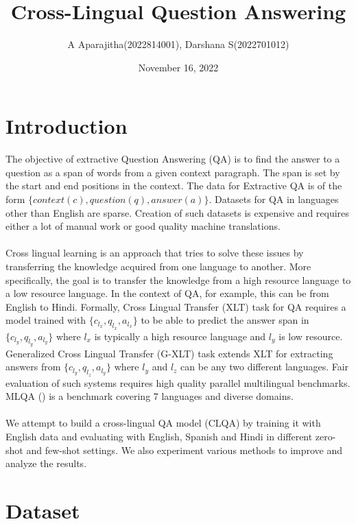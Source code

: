 \documentclass[12pt]{article}   %
\begin{document}
\title{Cross-Lingual Question Answering}   %
\author{A Aparajitha(2022814001), Darshana S(2022701012)}         %
\date{November 16, 2022}    %
\maketitle

\section{Introduction}

The objective of extractive Question Answering (QA) is to find the answer to a question as a span of words from a given context paragraph. The span is set by the start and end positions in the context. The data for Extractive QA is of the form $\{context(c), question(q), answer(a)\}$. Datasets for QA in languages other than English are sparse. Creation of such datasets is expensive and requires either a lot of manual work or good quality machine translations. \\ \\Cross lingual learning is an approach that tries to solve these issues by transferring the knowledge acquired from one language to another. More specifically, the goal is to transfer the knowledge from a high resource language to a low resource language. In the context of QA, for example, this can be from English to Hindi. Formally, Cross Lingual Transfer (XLT) task for QA requires a model trained with $\{c_{l_{x}}, q_{l_{x}}, a_{l_{x}}\}$ to be able to predict the answer span in $\{c_{l_{y}}, q_{l_{y}}, a_{l_{y}}\}$ where $l_{x}$ is typically a high resource language and $l_{y}$ is low resource. Generalized Cross Lingual Transfer (G-XLT) task extends XLT for extracting answers from $\{c_{l_{y}}, q_{l_{z}}, a_{l_{y}}\}$ where $l_{y}$ and $l_{z}$ can be any two different languages. Fair evaluation of such systems requires high quality parallel multilingual benchmarks. MLQA (\cite{lewis2020mlqa}) is a benchmark covering 7 languages and diverse domains. 
\\ \\We attempt to build a cross-lingual QA model (CLQA) by training it with English data and evaluating with English, Spanish and Hindi in different zero-shot and few-shot settings. We also experiment various methods to improve and analyze the results.

\section{Dataset}
\end{document}
